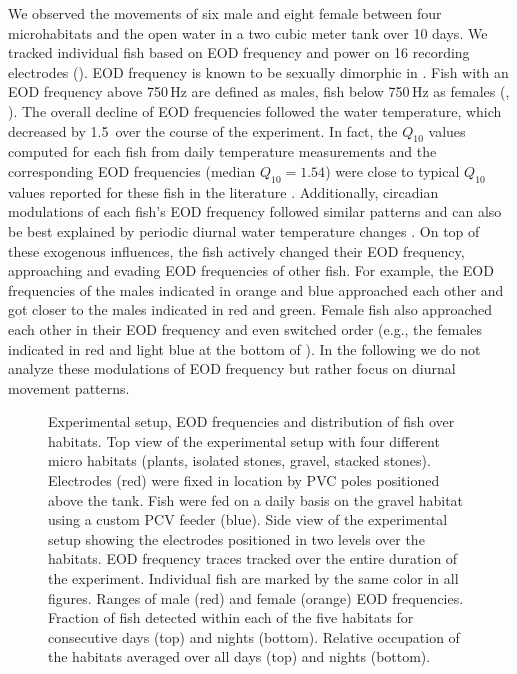 We observed the movements of six male and eight female \lepto{} between four microhabitats and the open water in a two cubic meter tank over 10 days. We tracked individual fish
based on EOD frequency and power on 16 recording electrodes (). EOD frequency is known to be sexually dimorphic in \lepto{} \citep{Meyer1987}. Fish with an EOD
frequency above 750\,Hz are defined as males, fish below 750\,Hz as females (, \citealp{Henninger2018}). The overall decline of EOD frequencies followed the water temperature, which decreased by 1.5\,\celsius{} over the course of the experiment. In fact, the $Q_{10}$ values computed for each fish from daily temperature
measurements and the corresponding EOD frequencies (median $Q_{10}=1.54$) were close to typical $Q_{10}$ values reported for these fish in the literature \citep{Dunlap2000, Stoeckel2014}. Additionally, circadian modulations of each fish's EOD frequency followed similar patterns and can also be best explained by periodic diurnal water temperature changes \citep{Dunlap2000}. On top of these exogenous influences, the fish actively changed
their EOD frequency, approaching and evading EOD frequencies of other fish. For example, the EOD frequencies of the males indicated in orange and blue approached each other and got
closer to the males indicated in red and green. Female fish also approached each other in their EOD frequency and even switched order (e.g., the females indicated in red and light blue at the bottom of ). In the following we do not analyze
these modulations of EOD frequency but rather focus on diurnal movement patterns.

\begin{figure*}[p]
  \caption{\label{eodtraces} Experimental setup, EOD frequencies and
    distribution of fish over habitats.  Top view of the
    experimental setup with four different micro habitats (plants,
    isolated stones, gravel, stacked stones). Electrodes (red) were
    fixed in location by PVC poles positioned above the tank. Fish
    were fed on a daily basis on the gravel habitat using a custom PCV
    feeder (blue).  Side view of the experimental setup
    showing the electrodes positioned in two levels over the
    habitats.  EOD frequency traces tracked over the entire
    duration of the experiment. Individual fish are marked by the same
    color in all figures.  Ranges of male (red) and female
    (orange) EOD frequencies.  Fraction of fish detected
    within each of the five habitats for consecutive days (top) and
    nights (bottom).  Relative occupation of the habitats
    averaged over all days (top) and nights (bottom).}
\end{figure*}

